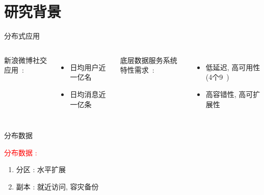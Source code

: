 \section{研究背景}

\begin{frame}{分布式应用}
  \vspace{0.50cm}

  \begin{columns}
	新浪微博社交应用~\footnotemark:
	\begin{itemize}
	  \item 日均用户近一亿名
	  \item 日均消息近一亿条
	\end{itemize}
	\pause
	底层数据服务系统特性需求~: 
	\begin{itemize}
	  \item 低延迟, 高可用性 (4个9~\footnotemark)
	  \item 高容错性, 高可扩展性
	\end{itemize}
  \end{columns}
  
\end{frame}
\begin{frame}{分布数据}
  \graphicspath{{tikz-in-beamer/}}
  \begin{figure}[h!]
    \centering
    \begin{adjustbox}{max totalsize = {0.50\textwidth}{1.00\textheight}, center}
	  
    \end{adjustbox}
  \end{figure}

  \textcolor{red}{分布数据 :}
  \begin{enumerate}
	\item<2-> 分区 : 水平扩展
	\item<3-> 副本 : 就近访问, 容灾备份
  \end{enumerate}
\end{frame}
